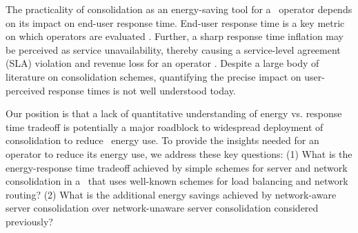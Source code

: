 
The practicality of consolidation as an energy-saving tool for a \cdc\ operator depends on its impact on end-user response time. End-user response time is a key metric on which  operators are evaluated \cite{comparingCDN}. Further, a sharp response time inflation may be perceived as service unavailability, thereby causing a service-level agreement (SLA) violation and revenue loss for an operator \cite{amazonSLA, microsoftSLA, hpSLA}. Despite a large body of literature on consolidation schemes, quantifying the precise impact on user-perceived response times is not well understood today.

Our position is that a lack of quantitative understanding of energy vs. response time tradeoff is potentially a major roadblock to widespread deployment of consolidation to reduce \cdc\ energy use. To provide the insights needed for an operator to reduce its energy use, we address these key questions: (1) What is the energy-response time tradeoff achieved by simple schemes for server and network consolidation in a \cdc\ that uses well-known schemes for load balancing and network routing? (2) What is the additional energy savings achieved by network-aware server consolidation over network-unaware server consolidation considered previously?


%



